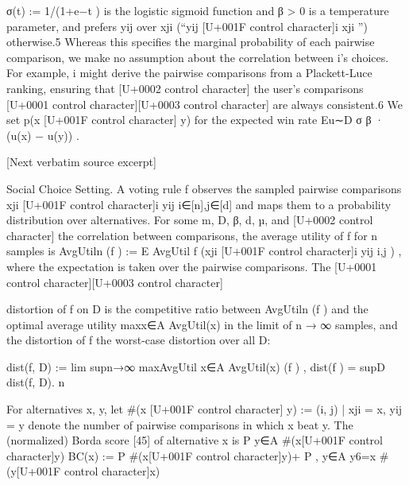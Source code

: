 \documentclass[10pt]{article}
\begin{document}
\begin{ReviewVerbatim}
σ(t) := 1/(1+e−t ) is the logistic sigmoid function and β > 0 is a temperature parameter, and prefers
yij over xji (“yij [U+001F control character]i xji ”) otherwise.5 Whereas this specifies the marginal probability of each pairwise
comparison, we make no assumption about the correlation between i’s choices. For example, i might
derive the pairwise comparisons from a Plackett-Luce ranking, ensuring that      [U+0002 control character] the user’s comparisons  [U+0001 control character][U+0003 control character]
are always consistent.6 We set p(x [U+001F control character] y) for the expected win rate Eu∼D σ β · (u(x) − u(y)) .

[Next verbatim source excerpt]

Social Choice Setting. A voting rule f observes the sampled pairwise comparisons {xji [U+001F control character]i
yij }i∈[n],j∈[d] and maps them to a probability distribution over alternatives. For some m, D, β, d, µ,
and
  [U+0002 control character] the correlation between comparisons,     the average utility of f for n samples is AvgUtiln (f ) :=
E AvgUtil f ({xji [U+001F control character]i yij }i,j ) , where the expectation is taken over the pairwise comparisons. The
                               [U+0001 control character][U+0003 control character]

distortion of f on D is the competitive ratio between AvgUtiln (f ) and the optimal average utility
maxx∈A AvgUtil(x) in the limit of n → ∞ samples, and the distortion of f the worst-case distortion
over all D:

            dist(f, D) := lim supn→∞ maxAvgUtil
                                        x∈A AvgUtil(x)
                                                (f )   ,               dist(f ) = supD dist(f, D).
                                                       n



For alternatives x, y, let #(x [U+001F control character] y) := {(i, j) | xji = x, yij = y} denote the number of pairwise
comparisons in which x beat y. The (normalized) Borda score [45] of alternative x is
                                                       P
                                                         y∈A #(x[U+001F control character]y)
                                   BC(x) := P         #(x[U+001F control character]y)+
                                                              P             ,
                                                  y∈A           y6=x #(y[U+001F control character]x)



\end{ReviewVerbatim}
\end{document}
